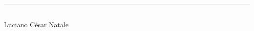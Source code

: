 \newpage
\thispagestyle{empty}

\

\

\

\

\

\

\

\

\

\

\

\

\

\begin{center}
\rule{7cm}{0.5pt}\\
Luciano César Natale
\end{center}
